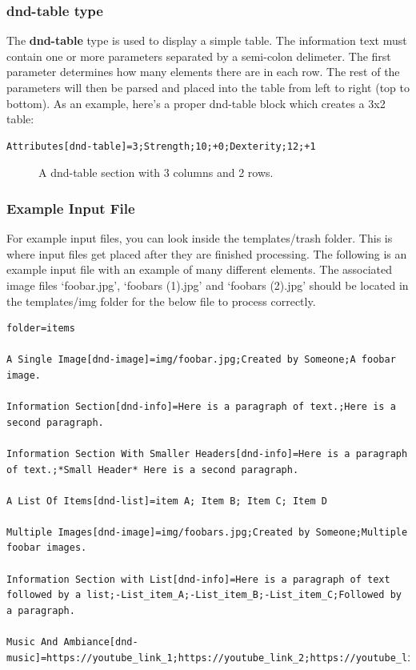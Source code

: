 \subsubsection{dnd-table type}

The \textbf{dnd-table} type is used to display a simple table. The information text must contain one or more parameters separated by a semi-colon delimeter. The first parameter determines how many elements there are in each row. The rest of the parameters will then be parsed and placed into the table from left to right (top to bottom). As an example, here's a proper dnd-table block which creates a 3x2 table:

\begin{lstlisting}
Attributes[dnd-table]=3;Strength;10;+0;Dexterity;12;+1
\end{lstlisting}

\begin{figure}[h]
	\centering
	\caption{A dnd-table section with 3 columns and 2 rows.}
	\label{fig:dnd-table-fig}
\end{figure}


\subsubsection{Example Input File}

For example input files, you can look inside the templates/trash folder. This is where input files get placed after they are finished processing. The following is an example input file with an example of many different elements. The associated image files `foobar.jpg', `foobars (1).jpg' and `foobars (2).jpg' should be located in the templates/img folder for the below file to process correctly.

\begin{lstlisting}
folder=items

A Single Image[dnd-image]=img/foobar.jpg;Created by Someone;A foobar image.

Information Section[dnd-info]=Here is a paragraph of text.;Here is a second paragraph.

Information Section With Smaller Headers[dnd-info]=Here is a paragraph of text.;*Small Header* Here is a second paragraph.

A List Of Items[dnd-list]=item A; Item B; Item C; Item D

Multiple Images[dnd-image]=img/foobars.jpg;Created by Someone;Multiple foobar images.

Information Section with List[dnd-info]=Here is a paragraph of text followed by a list;-List_item_A;-List_item_B;-List_item_C;Followed by a paragraph.

Music And Ambiance[dnd-music]=https://youtube_link_1;https://youtube_link_2;https://youtube_link_3
\end{lstlisting}

